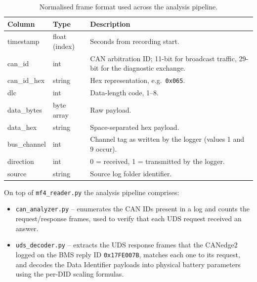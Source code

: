 \documentclass[11pt,a4paper,oneside,parskip=half]{scrreprt}
\providecommand{\hex}{}\renewcommand{\hex}[1]{\texttt{0x#1}}
\begin{document}
\begin{table}[H]
\caption{Normalised frame format used across the analysis pipeline.}
\label{tab:mf4_columns}
\centering
\begin{tabular}{lll}
\toprule
\textbf{Column} & \textbf{Type}       & \textbf{Description} \\
\midrule
timestamp       & float (index)      & Seconds from recording start. \\
can\_id         & int                & CAN arbitration ID; 11-bit for broadcast traffic, 29-bit for the diagnostic exchange. \\
can\_id\_hex    & string             & Hex representation, e.g.\ \texttt{0x065}. \\
dlc             & int                & Data-length code, 1--8. \\
data\_bytes     & byte array         & Raw payload. \\
data\_hex       & string             & Space-separated hex payload. \\
bus\_channel    & int                & Channel tag as written by the logger (values 1 and 9 occur). \\
direction       & int                & 0 = received, 1 = transmitted by the logger. \\
source          & string             & Source log folder identifier. \\
\bottomrule
\end{tabular}
\end{table}

On top of \texttt{mf4\_reader.py} the analysis pipeline comprises:

\begin{itemize}
  \item \texttt{can\_analyzer.py} -- enumerates the CAN IDs present in a log and counts the request/response frames, used to verify that each UDS request received an answer.
  \item \texttt{uds\_decoder.py} -- extracts the UDS response frames that the CANedge2 logged on the BMS reply ID \hex{17FE007B}, matches each one to its request, and decodes the Data Identifier payloads into physical battery parameters using the per-DID scaling formulas.
\end{itemize}
\end{document}
